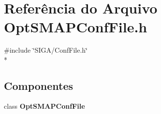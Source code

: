 \section{Referência do Arquivo Opt\+S\+M\+A\+P\+Conf\+File.\+h}
\label{_opt_s_m_a_p_conf_file_8h}
{\ttfamily \#include \char`\"{}S\+I\+G\+A/\+Conf\+File.\+h\char`\"{}}\\*
\subsection*{Componentes}
\begin{DoxyCompactItemize}
\item 
class {\bf Opt\+S\+M\+A\+P\+Conf\+File}
\end{DoxyCompactItemize}
